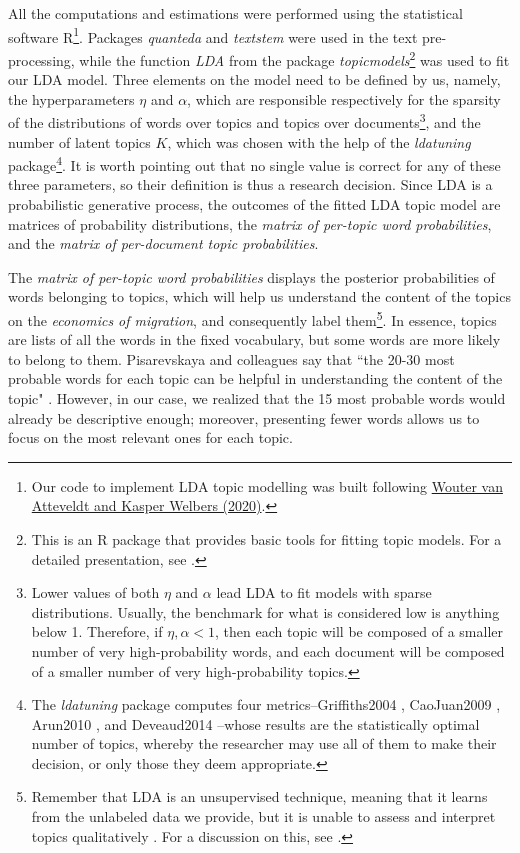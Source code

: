 All the computations and estimations were performed using the statistical software R\footnote{Our code to implement LDA topic modelling was built following \href{https://github.com/ccs-amsterdam/r-course-material/blob/master/tutorials/r_text_lda.md}{Wouter van Atteveldt and Kasper Welbers (2020)}.}. Packages \textit{quanteda} and \textit{textstem} were used in the text pre-processing, while the function \textit{LDA} from the package \textit{topicmodels}\footnote{This is an R package that provides basic tools for fitting topic models. For a detailed presentation, see \cite{grun_topicmodels_2011}.} was used to fit our LDA model. Three elements on the model need to be defined by us, namely, the hyperparameters $\eta$ and $\alpha$, which are responsible respectively for the sparsity of the distributions of words over topics and topics over documents\footnote{Lower values of both $\eta$ and $\alpha$ lead LDA to fit models with sparse distributions. Usually, the benchmark for what is considered low is anything below 1. Therefore, if $\eta, \alpha < 1$, then each topic will be composed of a smaller number of very high-probability words, and each document will be composed of a smaller number of very high-probability topics.}, and the number of latent topics $K$, which was chosen with the help of the \textit{ldatuning} package\footnote{The \textit{ldatuning} package computes four metrics--Griffiths2004 \citep{griffiths_finding_2004}, CaoJuan2009 \citep{cao_density-based_2009}, Arun2010 \citep{arun_finding_2010}, and Deveaud2014 \citep{deveaud_accurate_2014}--whose results are the statistically optimal number of topics, whereby the researcher may use all of them to make their decision, or only those they deem appropriate.}. It is worth pointing out that no single value is correct for any of these three parameters, so their definition is thus a research decision. Since LDA is a probabilistic generative process, the outcomes of the fitted LDA topic model are matrices of probability distributions, the \textit {matrix of per-topic word probabilities}, and the \textit{matrix of per-document topic probabilities}. 

The \textit{matrix of per-topic word probabilities} displays the posterior probabilities of words belonging to topics, which will help us understand the content of the topics on the \textit{economics of migration}, and consequently label them\footnote{Remember that LDA is an unsupervised technique, meaning that it learns from the unlabeled data we provide, but it is unable to assess and interpret topics qualitatively \citep{evans_machine_2016}. For a discussion on this, see \cite{chang_reading_2009}.}. In essence, topics are lists of all the words in the fixed vocabulary, but some words are more likely to belong to them. Pisarevskaya and colleagues say that ``the 20-30 most probable words for each topic can be helpful in understanding the content of the topic" \citep[p. 460]{pisarevskaya_mapping_2020}. However, in our case, we realized that the 15 most probable words would already be descriptive enough; moreover, presenting fewer words allows us to focus on the most relevant ones for each topic.

